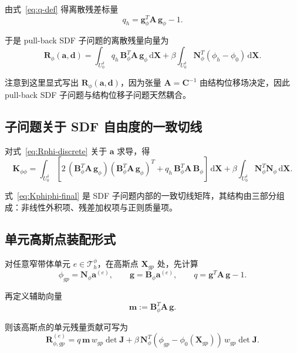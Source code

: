 \documentclass[12pt,a4paper]{ctexart}
\numberwithin{equation}{section}
\newcommand{\cT}{\mathcal{T}}
\newcommand{\bA}{\bm{A}}
\newcommand{\bC}{\bm{C}}
\newcommand{\bg}{\bm{g}}
\newcommand{\bK}{\bm{K}}
\newcommand{\bR}{\bm{R}}
\newcommand{\bN}{\bm{N}}
\newcommand{\bB}{\bm{B}}
\newcommand{\bd}{\bm{d}}
\newcommand{\ba}{\bm{a}}
\newcommand{\bX}{\bm{X}}
\newcommand{\dd}{\,\mathrm{d}}
\begin{document}
由式~\eqref{eq:q-def} 得离散残差标量
\begin{equation}
q_h = \bg_\phi^T \bA\,\bg_\phi - 1.
\label{eq:q-h}
\end{equation}

于是 pull-back SDF 子问题的离散残量向量为
\begin{equation}
\boxed{
\bR_\phi(\ba,\bd)
=
\int_{U_0^\delta}
q_h\,\bB_\phi^T \bA\,\bg_\phi\dd\bX
+
\beta\int_{U_0^\delta}
\bN_\phi^T(\phi_h-\phi_0)\dd\bX.
}
\label{eq:Rphi-discrete}
\end{equation}

注意到这里显式写出 $\bR_\phi(\ba,\bd)$，因为张量 $\bA=\bC^{-1}$ 由结构位移场决定，因此 pull-back SDF 子问题与结构位移子问题天然耦合。

\subsection{子问题关于 SDF 自由度的一致切线}

对式~\eqref{eq:Rphi-discrete} 关于 $\ba$ 求导，得
\begin{equation}
\boxed{
\bK_{\phi\phi}
=
\int_{U_0^\delta}
\left[
2\,(\bB_\phi^T \bA\,\bg_\phi)(\bB_\phi^T \bA\,\bg_\phi)^T
+
q_h\,\bB_\phi^T \bA\,\bB_\phi
\right]\dd\bX
+
\beta\int_{U_0^\delta}\bN_\phi^T\bN_\phi\dd\bX.
}
\label{eq:Kphiphi-final}
\end{equation}

式~\eqref{eq:Kphiphi-final} 是 SDF 子问题内部的一致切线矩阵，其结构由三部分组成：非线性外积项、残差加权项与正则质量项。

\subsection{单元高斯点装配形式}

对任意窄带体单元 $e\in\cT_h^\phi$，在高斯点 $\bX_{gp}$ 处，先计算
\begin{equation}
\phi_{gp}=\bN_\phi \ba^{(e)},
\qquad
\bg = \bB_\phi \ba^{(e)},
\qquad
q = \bg^T \bA\,\bg - 1.
\end{equation}

再定义辅助向量
\begin{equation}
\boldsymbol{m} := \bB_\phi^T \bA\,\bg.
\end{equation}

则该高斯点的单元残量贡献可写为
\begin{equation}
\boxed{
\bR_{\phi,gp}^{(e)}
=
q\,\boldsymbol{m}\,w_{gp}\det \bm{J}
+
\beta\,\bN_\phi^T(\phi_{gp}-\phi_0(\bX_{gp}))\,w_{gp}\det \bm{J}.
}
\label{eq:Rphi-gp}
\end{equation}
\end{document}
